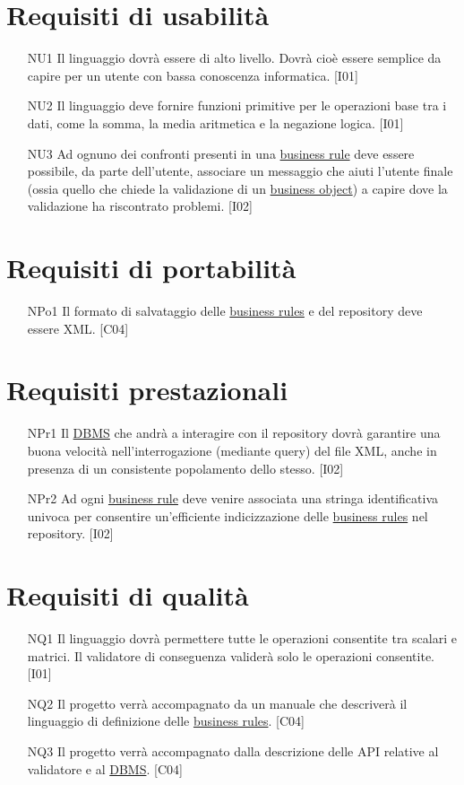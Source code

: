 \section{Requisiti di usabilit\`a}
\begin{itemize}
\item[NU1]{Il linguaggio dovr\`a essere di alto livello. Dovr\`a cio\`e essere semplice da capire per un utente con bassa conoscenza informatica. [I01]}
\item[NU2]{Il linguaggio deve fornire funzioni primitive per le operazioni base tra i dati, come la somma, la media aritmetica e la negazione logica. [I01]}
\item[NU3]{Ad ognuno dei confronti presenti in una \underline{business rule} deve essere possibile, da parte dell'utente, associare un messaggio che aiuti l'utente finale (ossia quello che chiede la validazione di un \underline{business object}) a capire dove la validazione ha riscontrato problemi. [I02]}
\end{itemize}

\section{Requisiti di portabilit\`a}
\begin{itemize}
\item[NPo1]{Il formato di salvataggio delle \underline{business rules} e del repository deve essere XML. [C04]}
\end{itemize}
\section{Requisiti prestazionali}
\begin{itemize}
 \item[NPr1]{Il \underline{DBMS} che andr\`a a interagire con il repository dovr\`a garantire una buona velocit\`a nell'interrogazione (mediante query) del file XML, anche in presenza di un consistente popolamento dello stesso. [I02]}
\item[NPr2]{Ad ogni \underline{business rule} deve venire associata una stringa identificativa univoca per consentire un'efficiente indicizzazione delle \underline{business rules} nel repository. [I02]}
\end{itemize}

\section{Requisiti di qualit\`a}
\begin{itemize}
\item[NQ1]{Il linguaggio dovr\`a permettere tutte le operazioni consentite tra scalari e matrici. Il validatore di conseguenza valider\`a solo le operazioni consentite. [I01]}
\item[NQ2]{Il progetto verr\`a accompagnato da un manuale che descriver\`a il linguaggio di definizione delle \underline{business rules}. [C04]}
\item[NQ3]{Il progetto verr\`a accompagnato dalla descrizione delle API relative al validatore e al \underline{DBMS}. [C04]}
\end{itemize}
\newpage


